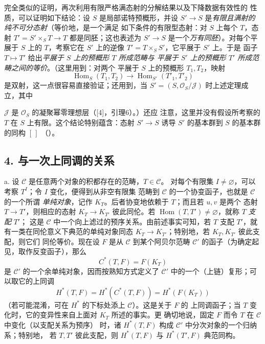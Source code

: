 完全类似的证明，再次利用有限严格满态射的分解结果以及下降数据有效性的
性质，可以证明如下结论：设 $S$ 是局部诺特预概形，并设
$S'\longrightarrow S$ 是\emph{有限且满射的纯不可分态射}（等价地，是一个满足
如下条件的有限型态射：对 $S$ 上每个 $T$，态射
$T'=S'\times_ST\longrightarrow T$ 都是同胚；这也表述为
$S'\longrightarrow S$ 是一个\emph{万有同胚}）。对每个平展于 $S$ 上的
$T$，考察它在 $S'$ 上的逆像 $T'=T\times_SS'$，它平展于 $S'$ 上。于是
函子 $T\longmapsto T'$ 给出\emph{平展于 $S$ 上的预概形 $T$ 所成范畴与
平展于 $S'$ 上的预概形 $T'$ 所成范畴之间的等价}。（这里用到：对两个
平展于 $S$ 上的预概形 $T_1,T_2$，映射
\[
  \operatorname{Hom}_S(T_1,T_2)\longrightarrow
  \operatorname{Hom}_{S'}(T'_1,T'_2)
\]
是双射，这一点很容易直接验证；还用到，当
$S'=(S,\mathcal O_S/\mathcal J)$ 时上述定理成立，其中

$\mathcal J$ 是 $\mathcal O_S$ 的凝聚幂零理想层（[4]，引理6）。）还应
注意，这里并没有假设所考察的 $T$ 在 $S$ 上有限。这个结论特别蕴含：态射
$S'\longrightarrow S$ 诱导 $S'$ 的基本群到 $S$ 的基本群的同构 $[\,]$
（）。

\subsection*{4. 与一次上同调的关系}

\medskip\noindent
a. 设 $\mathcal C$ 是任意两个对象的积都存在的范畴，$T\in\mathcal C$。
对每个有限集 $I\ne\varnothing$，可以考察 $T^I$；令 $I$ 变化，便得到从非空有限集
范畴到 $\mathcal C$ 的一个协变函子，也就是 $\mathcal C$ 的一个所谓
\emph{单纯对象}，记作 $K_T$。后者协变地依赖于 $T$；而且若 $u,v$ 是两个
态射 $T\longrightarrow T'$，则相应的态射
$K_T\longrightarrow K_{T'}$ 彼此同伦。若
$\operatorname{Hom}(T,T')\ne\varnothing$，就称 $T$ \emph{支配} $T'$；
这是 $\mathcal C$ 中一个向上滤过的预序关系。由前述事实可知，若 $T$ 支配
$T'$，就有一类在同伦意义下典范的单纯对象同态
$K_T\longrightarrow K_{T'}$；特别地，若 $K_T,K_{T'}$ 彼此支配，则它们
同伦等价。现在设 $F$ 是从 $\mathcal C$ 到某个阿贝尔范畴
$\mathcal C'$ 的函子（为确定起见，取作反变函子），那么
\[
  C^*(T,F)=F(K_T)
\]
是 $\mathcal C'$ 的一个余单纯对象，因而按熟知方式定义了
$\mathcal C'$ 中的一个（上链）复形；可以取它的上同调
\[
  H^*(T,F)=H^*(C^*(T,F))=H^*(F(K_T))
\]
（若可能混淆，可在 $H^*$ 的下标处添上 $\mathcal C$）。这是关于 $F$ 的
上同调函子；当 $T$ 变化时，它的变异性来自上面对 $K_T$ 所述的事实。更
确切地说，固定 $F$ 而令 $T$ 在 $\mathcal C$ 中变化（以支配关系为预序）
时，诸 $H^*(T,F)$ 构成 $\mathcal C'$ 中分次对象的一个归纳系；特别地，
若 $T,T'$ 彼此支配，则 $H^*(T,F)$ 与 $H^*(T',F)$ 典范同构。

